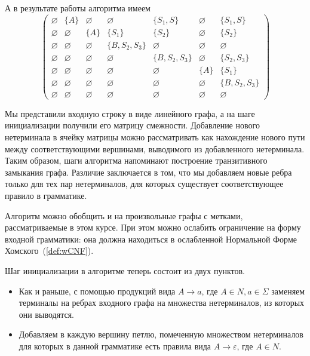 А в результате работы алгоритма имеем
\[
    \begin{pmatrix}
        \varnothing & \{A\}       & \varnothing & \varnothing     & \{S_1, S\}      & \varnothing & \{S_1, S\}      \\
        \varnothing & \varnothing & \{A\}       & \{S_1\}         & \{S_2\}         & \varnothing & \{S_2\}         \\
        \varnothing & \varnothing & \varnothing & \{B, S_2, S_3\} & \varnothing     & \varnothing & \varnothing     \\
        \varnothing & \varnothing & \varnothing & \varnothing     & \{B, S_2, S_3\} & \varnothing & \{S_2, S_3\}    \\
        \varnothing & \varnothing & \varnothing & \varnothing     & \varnothing     & \{A\}       & \{S_1\}         \\
        \varnothing & \varnothing & \varnothing & \varnothing     & \varnothing     & \varnothing & \{B, S_2, S_3\} \\
        \varnothing & \varnothing & \varnothing & \varnothing     & \varnothing     & \varnothing & \varnothing
    \end{pmatrix}
\]

Мы представили входную строку в виде линейного графа, а на шаге инициализации получили его матрицу смежности.
Добавление нового нетерминала в ячейку матрицы можно рассматривать как нахождение нового пути между соответствующими вершинами, выводимого из добавленного нетерминала.
Таким образом, шаги алгоритма напоминают построение транзитивного замыкания графа.
Различие заключается в том, что мы добавляем новые ребра только для тех пар нетерминалов, для которых существует соответствующее правило в грамматике.

Алгоритм можно обобщить и на произвольные графы с метками, рассматриваемые в этом курсе.
При этом можно ослабить ограничение на форму входной грамматики: она должна находиться в ослабленной Нормальной Форме Хомского~(\ref{def:wCNF}).

Шаг инициализации в алгоритме теперь состоит из двух пунктов.
\begin{itemize}
    \item Как и раньше, с помощью продукций вида $A \to a$, где $A \in N, a \in \Sigma$ заменяем терминалы на ребрах входного графа на множества нетерминалов, из которых они выводятся.
    \item Добавляем в каждую вершину петлю, помеченную множеством нетерминалов для которых в данной грамматике есть правила вида $A \to \varepsilon$, где $A \in N$.
\end{itemize}

